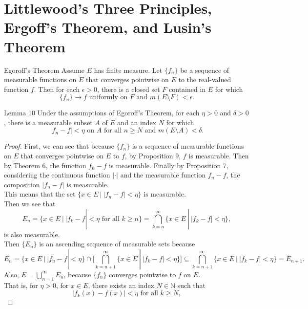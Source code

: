 \section{Littlewood's Three Principles, Ergoff's Theorem, and Lusin's Theorem}
\begin{flushleft}
    \begin{namedthm*}{Egoroff's Theorem}
        Assume $E$ has finite measure. Let $\{f_n\}$ be a sequence of measurable functions on $E$ that converges pointwise on $E$ to the real-valued function $f$.
        Then for each $\epsilon>0$, there is a closed set $F$ contained in $E$ for which     
        \[
            \{f_n\}\to f\text{ uniformly on }F\text{ and }m(E\setminus F)<\epsilon.    
        \]
    \end{namedthm*}
    \begin{namedthm*}{Lemma 10}
        Under the assumptions of Egoroff's Theorem, for each $\eta>0$ and $\delta>0$, there is a measurable subset $A$ of $E$ and an index $N$ for which
        \[
            |f_n-f|<\eta\text{ on }A\text{ for all }n\ge N\text{ and }m(E\setminus A)<\delta.    
        \]
    \end{namedthm*}
    \begin{proof}
        First, we can see that because $\{f_n\}$ is a sequence of measurable functions on $E$ that converges pointwise on $E$ to $f$, by Proposition 9, $f$ is measurable.
        Then by Theorem 6, the function $f_n-f$ is measurable.
        Finally by Proposition 7, considering the continuous function $|\cdot|$ and the measurable function $f_n-f$, the composition $|f_n-f|$ is measurable.
        \\This means that the set $\{x\in E\ |\ |f_n-f|<\eta\}$ is measurable.
        \\Then we see that
        \[
            E_n=\{x\in E\ |\ |f_k-f|<\eta\text{ for all }k\ge n\}=\bigcap_{k=n}^\infty\{x\in E\ |\ |f_k-f|<\eta\},
        \]
        is also measurable.
        \\Then $\{E_n\}$ is an ascending sequence of measurable sets because 
        \[
            E_n=\{x\in E\ |\ |f_n-f|<\eta\}\cap\biggl[\bigcap_{k={n+1}}^\infty\{x\in E\ |\ |f_k-f|<\eta\}\biggr]\subseteq \bigcap_{k={n+1}}^\infty\{x\in E\ |\ |f_k-f|<\eta\}=E_{n+1}.
        \]
        Also, $E=\bigcup_{n=1}^\infty E_n$, because $\{f_n\}$ converges pointwise to $f$ on $E$. 
        \\That is, for $\eta>0$, for $x\in E$, there exists an index $N\in\mathbb{N}$ such that
        \[
            |f_k(x)-f(x)|<\eta\text{ for all }k\ge N,
\]
\end{proof}
\end{flushleft}
